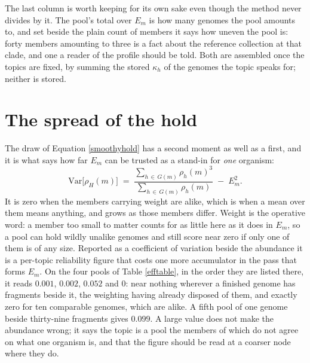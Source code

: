\documentclass[pdflatex,sn-vancouver-num]{sn-jnl}
\begin{document}
\begin{appendices}
    The last column is worth keeping for its own sake even though the method never divides by it.
    The pool's total over $E_m$ is how many genomes the pool amounts to, and set beside the plain count of members it
    says how uneven the pool is: forty members amounting to three is a fact about the reference
    collection at that clade, and one a reader of the profile should be told. Both are assembled once
    the topics are fixed, by summing the stored $\kappa_h$ of the genomes the topic speaks for;
    neither is stored.

    \section{The spread of the hold}\label{holdspread}
    \setcounter{equation}{0}
    The draw of Equation \eqref{smoothyhold} has a second moment as well as a first, and it is what
    says how far $E_m$ can be trusted as a stand-in for \emph{one} organism:
    \begin{equation}\label{smoothyholdvar}
        \mathrm{Var}\bigl[ \rho_H(m) \bigr] \;=\;
            \frac{\sum_{h \,\in\, G(m)} \rho_h(m)^{3}}{\sum_{h \,\in\, G(m)} \rho_h(m)} \;-\; E_m^{2} .
    \end{equation}
    It is zero when the members carrying weight are alike, which is when a mean over them means
    anything, and grows as those members differ. Weight is the operative word: a member too small to
    matter counts for as little here as it does in $E_m$, so a pool can hold wildly unalike genomes
    and still score near zero if only one of them is of any size. Reported as a coefficient of
    variation beside
    the abundance it is a per-topic reliability figure that costs one more accumulator in the pass
    that forms $E_m$. On the four pools of Table \ref{efftable}, in the order they are listed there,
    it reads $0.001$, $0.002$, $0.052$ and $0$: near nothing wherever a finished genome has fragments
    beside it, the weighting having already disposed of them, and exactly zero for ten comparable
    genomes, which are alike. A fifth pool of one genome
    beside thirty-nine fragments gives $0.099$. A large value does not make the abundance wrong; it says the topic is a pool the members
    of which do not agree on what one organism is, and that the figure should be read at a coarser
    node where they do.


\end{appendices}
\end{document}
